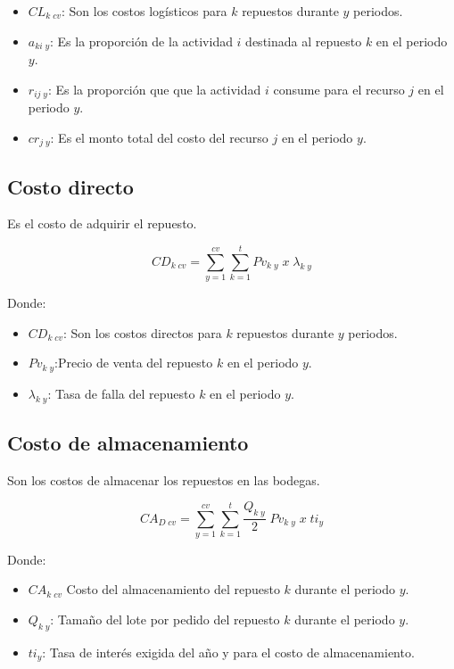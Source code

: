 \documentclass{article}
\begin{document}
\begin{itemize}
    \item $CL_{k\;cv}$: Son los costos logísticos para $k$ repuestos durante $y$ periodos.
    \item $a_{ki\;y}$: Es la proporción de la actividad $i$ destinada al repuesto $k$ en el periodo $y$.
    \item $r_{ij\;y}$: Es la proporción que que la actividad $i$ consume para el recurso $j$ en el periodo $y$.
    \item $cr_{j\;y}$: Es el monto total del costo del recurso $j$ en el periodo $y$.
\end{itemize}


\subsection{Costo directo}

Es el costo de adquirir el repuesto.

\begin{equation}
  CD_{k\;cv}=\sum_{y=1}^{cv} \sum_{k=1}^{t} Pv_{k\;y}\;x\; \lambda_{k\;y}
\end{equation}

Donde:

\begin{itemize}
    \item $CD_{k\;cv}$: Son los costos directos para $k$ repuestos durante $y$ periodos.
    \item $Pv_{k\;y}$:Precio de venta del repuesto $k$ en el periodo $y$.
    \item $\lambda_{k\;y}$: Tasa de falla del repuesto $k$ en el periodo $y$.
\end{itemize}


\subsection{Costo de almacenamiento}

Son los costos de almacenar los repuestos en las bodegas.

\begin{equation}
  CA_{D\;cv}=\sum_{y=1}^{cv} \sum_{k=1}^{t} \frac{Q_{k\;y}}{2}\;Pv_{k\;y}\;x\; ti_{y}
  \end{equation}

Donde:

\begin{itemize}
    \item $CA_{k\;cv}$ Costo del almacenamiento del repuesto $k$ durante el periodo $y$.
    \item $Q_{k\;y}$: Tamaño del lote por pedido del repuesto $k$ durante el periodo $y$. 
    \item $ti_{y}$: Tasa de interés exigida del año y para el costo de almacenamiento.
\end{itemize}
\end{document}
